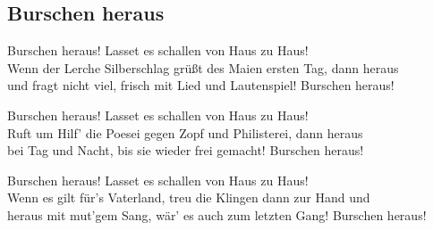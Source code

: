 
\subsection*{Burschen heraus}
%

\thestrophe Burschen heraus! Lasset es schallen von Haus zu Haus! \\
Wenn der Lerche Silberschlag grüßt des Maien ersten Tag, dann heraus \\
und fragt nicht viel, frisch mit Lied und Lautenspiel! Burschen heraus! 

\thestrophe Burschen heraus! Lasset es schallen von Haus zu Haus! \\
Ruft um Hilf' die Poesei gegen Zopf und Philisterei, dann heraus \\
bei Tag und Nacht, bis sie wieder frei gemacht! Burschen heraus!

\thestrophe Burschen heraus! Lasset es schallen von Haus zu Haus! \\
Wenn es gilt für's Vaterland, treu die Klingen dann zur Hand und \\
heraus mit mut'gem Sang, wär' es auch zum letzten Gang! Burschen heraus!